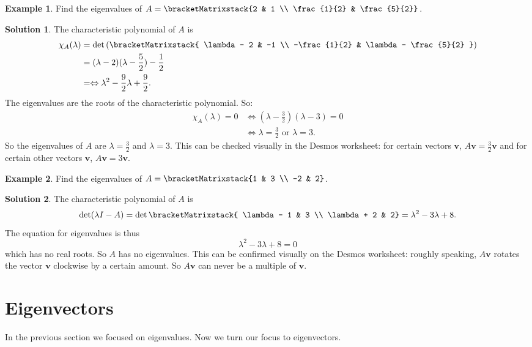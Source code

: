 \documentclass[a4paper,11pt]{book}
\theoremstyle{definition}
\newtheorem{example_environment}{Example}[chapter]
\newtheorem*{solution}{Solution}
\newcommand{\ve}[1]{\mathbf{#1}}
\newcommand{\cmatrix}[1]{\bracketMatrixstack{#1}}
\newenvironment{example}
	{
		\begin{oframed} 
		\begin{example_environment}
	}
	{
		\end{example_environment}
		\end{oframed}
	}
\begin{document}
\begin{example} \label{desmos_matrix} Find the eigenvalues of $A = \cmatrix{2 & 1 \\ \frac{1}{2} & \frac{5}{2}}$. 
\begin{solution} 
The characteristic polynomial of $A$ is
\begin{align*}
 \chi_A(\lambda) &= \det \left({\cmatrix{ \lambda - 2 & -1 \\ -\frac{1}{2} & \lambda - \frac{5}{2} }} \right)  \\
 &= (\lambda - 2)(\lambda - \frac{5}{2}) - \frac{1}{2} \\
 &= \Leftrightarrow \lambda^2 - \frac{9}{2} \lambda + \frac{9}{2}.
 \end{align*}
The eigenvalues are the roots of the characteristic polynomial. So:
\begin{align*}
  \chi_A (\lambda) = 0 &\Leftrightarrow (\lambda - \frac{3}{2})(\lambda - 3) = 0 \\
 & \Leftrightarrow \lambda = \frac{3}{2} \text{ or } \lambda = 3.
\end{align*}
So the eigenvalues of $A$ are $\lambda = \frac{3}{2}$ and $\lambda = 3$. This can be checked visually in the Desmos worksheet: for certain vectors $\ve{v}$, $A \ve{v} = \frac{3}{2} \ve{v}$ and for certain other vectors $\ve{v}$, $A \ve{v} = 3 \ve{v}$.
\end{solution}
\end{example} 

\begin{example} Find the eigenvalues of $A = \cmatrix{1 & 3 \\ -2 & 2}$.
\begin{solution}
The characteristic polynomial of $A$ is 
\[
\det (\lambda I - A) = \det \cmatrix{ \lambda - 1 & 3 \\ \lambda + 2 & 2} = \lambda^2 - 3\lambda + 8.
\]
The equation for eigenvalues is thus
\[
 \lambda^2 - 3\lambda + 8 = 0
\]
which has no real roots. So $A$ has no eigenvalues. This can be confirmed visually on the Desmos worksheet: roughly speaking, $A\ve{v}$ rotates the vector $\ve{v}$ clockwise by a certain amount. So $A \ve{v}$ can never be a multiple of $\ve{v}$.
\end{solution}
\end{example}


\section{Eigenvectors} \label{Ch4Sec2Eigenvectors}
In the previous section we focused on eigenvalues. Now we turn our focus to eigenvectors.
\end{document}
